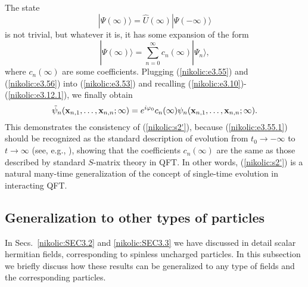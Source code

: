 \documentclass[12pt,twoside]{report} %
\begin{document}
The state
\begin{equation}\label{nikolic:e3.55.1}
 |\Psi(\infty)\rangle=\hat{U}(\infty)|\Psi(-\infty)\rangle 
\end{equation}
is not trivial, but whatever it is, it has some expansion of the form
\begin{equation}\label{nikolic:e3.56}
 |\Psi(\infty)\rangle =  \sum_{n=0}^{\infty} c_{n}(\infty)|\Psi_{n}\rangle , 
\end{equation}
where $c_{n}(\infty)$ are some coefficients. 
Plugging (\ref{nikolic:e3.55}) and (\ref{nikolic:e3.56})
into (\ref{nikolic:e3.53}) and recalling (\ref{nikolic:e3.10})-(\ref{nikolic:e3.12.1}),
we finally obtain
\begin{equation}\label{nikolic:e3.57}
 \tilde{\psi}_n({\bf x}_{n,1},\ldots,{\bf x}_{n,n};\infty)=
e^{i\varphi_0} c_n(\infty) \psi_n({\bf x}_{n,1},\ldots,{\bf x}_{n,n};\infty) .
\end{equation}
This demonstrates the consistency of (\ref{nikolic:s2'}), because (\ref{nikolic:e3.55.1}) 
should be recognized as the standard description of evolution from
$t_0\rightarrow -\infty$ to $t\rightarrow \infty$ (see, e.g., \cite{chengli,bd2}),
showing that the coefficients $c_n(\infty)$ are the same as those described 
by standard $S$-matrix theory in QFT.
In other words, (\ref{nikolic:s2'}) is a natural many-time generalization of the concept of 
single-time evolution in interacting QFT.
 

\subsection{Generalization to other types of particles}
\label{nikolic:SEC3.4}

In Secs.~\ref{nikolic:SEC3.2} and \ref{nikolic:SEC3.3} we have discussed in detail
scalar hermitian fields, corresponding to spinless uncharged particles.
In this subsection we briefly discuss how these results can be
generalized to any type of fields and the corresponding particles.
\end{document}
